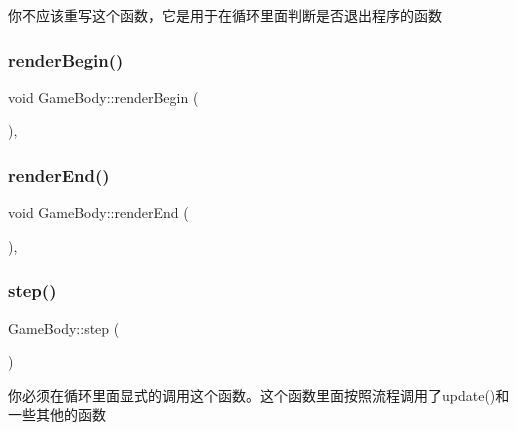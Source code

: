 你不应该重写这个函数，它是用于在循环里面判断是否退出程序的函数 

\mbox{\label{class_game_body_a05ce167838e2b7248090e62d85e9f5b0}} 
\subsubsection{\texorpdfstring{renderBegin()}{renderBegin()}}
{\footnotesize\ttfamily void Game\+Body\+::render\+Begin (\begin{DoxyParamCaption}{ }\end{DoxyParamCaption})\hspace{0.3cm}{\ttfamily [protected]}, {\ttfamily [virtual]}}

\mbox{\label{class_game_body_a630601ce51c48d11096afcfbafa9516f}} 
\subsubsection{\texorpdfstring{renderEnd()}{renderEnd()}}
{\footnotesize\ttfamily void Game\+Body\+::render\+End (\begin{DoxyParamCaption}{ }\end{DoxyParamCaption})\hspace{0.3cm}{\ttfamily [protected]}, {\ttfamily [virtual]}}

\mbox{\label{class_game_body_a4eca53ae69ac545e3e3666d7929a9cf4}} 
\subsubsection{\texorpdfstring{step()}{step()}}
{\footnotesize\ttfamily Game\+Body\+::step (\begin{DoxyParamCaption}{ }\end{DoxyParamCaption})\hspace{0.3cm}{\ttfamily [virtual]}}



你必须在循环里面显式的调用这个函数。这个函数里面按照流程调用了update()和一些其他的函数 

\mbox{\label{class_game_body_abeff43d0ab34cf69977c386736953552}} 
